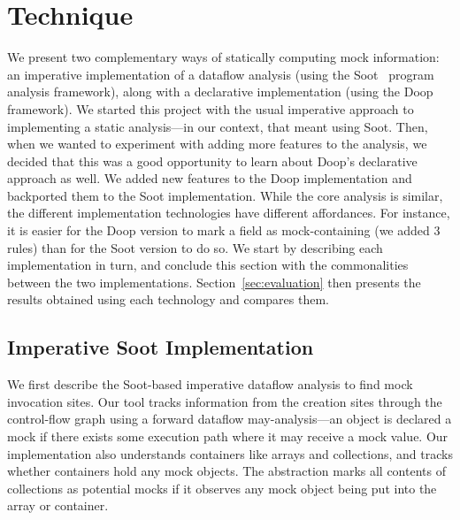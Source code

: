 \section{Technique}
\label{sec:technique}

We present two complementary ways of statically computing mock information: an imperative implementation of a dataflow analysis (using the Soot~\cite{Vallee-Rai:1999:SJB:781995.782008} program analysis framework), along with a declarative implementation (using the Doop~\cite{bravenboer09:_stric_declar_specif_sophis_point_analy} framework). We started this project with the usual imperative approach to implementing a static analysis---in our context, that meant using Soot. Then, when we wanted to experiment with adding more features to the analysis, we decided that this was a good opportunity to learn about Doop's declarative approach as well. We added new features to the Doop implementation and backported them to the Soot implementation. While the core analysis is similar, the different implementation technologies have different affordances. For instance, it is easier for the Doop version to mark a field as mock-containing (we added 3 rules) than for the Soot version to do so. We start by describing each implementation in turn, and conclude this section with the commonalities between the two implementations. Section~\ref{sec:evaluation} then presents the results obtained using each technology and compares them.

\subsection{Imperative Soot Implementation}
\label{subsec:soot}
We first describe the Soot-based imperative dataflow analysis to find mock invocation sites. Our tool tracks information from the creation sites through the control-flow graph using a forward dataflow may-analysis---an object is declared a mock if there exists some execution path where it may receive a mock value. Our implementation also understands containers like arrays and collections, and tracks whether containers hold any mock objects. The abstraction marks all contents of collections as potential mocks if it observes any mock object being put into the array or container.


